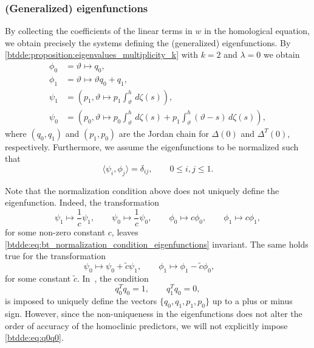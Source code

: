 \subsubsection{(Generalized) eigenfunctions}
By collecting the coefficients of the linear terms in $w$ in the
homological equation, we obtain precisely the systems
defining the (generalized) eigenfunctions. By
\cref{btdde:proposition:eigenvalues_multiplicity_k} with $k=2$ and $\lambda=0$ we
obtain
\begin{align*}
    \phi_0  & =  \vartheta \mapsto q_0, \\
    \phi_1  & =  \vartheta \mapsto \vartheta q_0 + q_1, \\
    \psi_1 & = \left( p_1, \vartheta \mapsto p_1 \int_\vartheta^h \, d\zeta(s) \right), \nonumber \\
    \psi_0 & = \left( p_0, \vartheta \mapsto p_0 \int_\vartheta^h \, d\zeta(s)
                            + p_1 \int_{\vartheta}^h (\vartheta-s)\,d\zeta(s) \right),\nonumber 
\end{align*}
where $(q_0,q_1)$ and $(p_1,p_0)$ are the Jordan chain for $\Delta(0)$ and $\Delta^T(0)$, respectively.
Furthermore, we assume the eigenfunctions to be normalized such that
\begin{equation}
    \label{btdde:eq:bt_normalization_condition_eigenfunctions}
    \langle\psi_i,\phi_j\rangle = \delta_{ij}, \qquad 0\leq i,j \leq 1.
\end{equation}

\begin{remark}
Note that the normalization condition above does not uniquely define the eigenfunction. Indeed,
the transformation
\begin{equation}
    \psi_1 \mapsto \frac1c \psi_1, \qquad
    \psi_0 \mapsto \frac1c \psi_0, \qquad
    \phi_0 \mapsto c \phi_0, \qquad
    \phi_1 \mapsto c \phi_1,
\end{equation}
for some non-zero constant $c$, leaves \cref{btdde:eq:bt_normalization_condition_eigenfunctions} invariant.
The same holds true for the transformation
\begin{equation}
    \psi_0 \mapsto \psi_0 + \tilde c \psi_1, \qquad
    \phi_1 \mapsto \phi_1 - \tilde c \phi_0, \qquad
\end{equation}
for some constant $\tilde c$. In~\cite{Kuznetsov2005practical}, the condition
\begin{equation}
\label{btdde:eq:q0q0} 
q_0^T q_0 = 1,\qquad q_1^T q_0 = 0,
\end{equation}
is imposed to uniquely define the vectors $\{q_0,q_1,p_1,p_0\}$ up to a plus or
minus sign. However, since the non-uniqueness in the eigenfunctions does not alter the
order of accuracy of the homoclinic predictors, we will not explicitly impose \cref{btdde:eq:q0q0}.
\end{remark}


